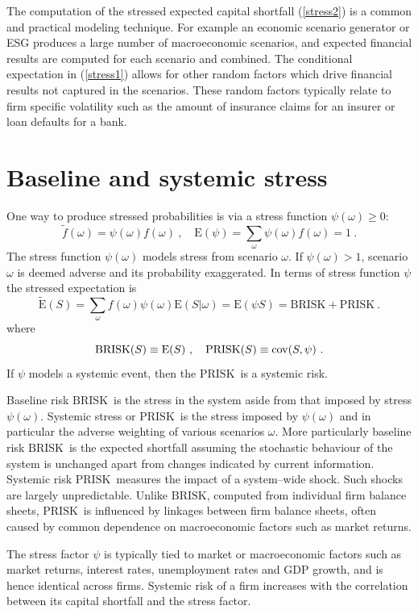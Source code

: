 \documentclass[authoryear]{elsarticle}
\newcommand{\cov}{{\rm cov}}
\newcommand{\E}{{\mathrm E}}
\newcommand{\cq}{\ ,\quad }
\newcommand{\eref}[1]{(\ref{#1})}
\newcommand{\br}{\ensuremath{\mathrm{BRISK}}}
\newcommand{\pr}{\ensuremath{\mathrm{PRISK}}}
\begin{document}
The computation of the stressed expected capital shortfall  \eref{stress2} is a common and practical modeling technique.  For example an economic scenario generator or ESG produces a large number of macroeconomic scenarios, and expected financial results are computed for each scenario and combined. The conditional expectation in \eref{stress1} allows for other random factors which drive financial results not captured in the scenarios. These random factors typically relate to firm specific volatility such as the amount of insurance claims for an insurer or loan defaults for a bank.



\section{Baseline and systemic stress}\label{s_sfactor}

One way to produce stressed probabilities is via a stress function $\psi(\omega)\ge 0$:
$$
\tilde f(\omega) = \psi(\omega) f(\omega)\cq \E(\psi) =\sum_\omega \psi(\omega)f(\omega) =  1\ .
$$
The stress function  $\psi(\omega)$ models stress from scenario $\omega$. If $\psi(\omega)>1$, scenario $\omega$ is deemed adverse and its probability exaggerated.  In terms of  stress function $\psi$ the stressed expectation is
\begin{equation}\label{stress3}
\widetilde \E(S) = \sum_\omega f(\omega) \psi(\omega) \E(S|\omega) = \E(\psi S) = \br+\pr\ .
\end{equation}
where
$$
\br(S)\equiv\E(S)\cq \pr(S) \equiv\cov(S,\psi)\ .
$$
   If $\psi$ models a systemic event, then the \pr\  is a systemic risk.


Baseline risk \br\ is the stress in the system aside from that imposed by stress $\psi(\omega)$.  Systemic stress or \pr\  is the stress imposed by $\psi(\omega)$ and in particular the adverse weighting  of various scenarios $\omega$.
More particularly baseline risk \br\  is the expected shortfall assuming the stochastic behaviour of the system is unchanged apart from changes indicated by current information. Systemic risk \pr\  measures the impact of a system--wide shock.  Such shocks are largely unpredictable. Unlike \br, computed from individual firm balance sheets, \pr\  is influenced by linkages between firm balance sheets, often caused by common dependence on macroeconomic factors such as market returns.
  
The stress factor $\psi$ is typically  tied to market or macroeconomic factors such as market returns, interest rates, unemployment rates and GDP growth, and is hence identical across firms. Systemic risk of a firm increases with the correlation between its capital shortfall and the stress factor.
\end{document}

